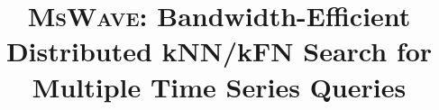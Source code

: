 \documentclass{sig-alternate}
\newcommand{\MSWaveT}{{\LARGE \textsc{MsWave}}}
\begin{document}
%

\title{\MSWaveT{}: Bandwidth-Efficient Distributed kNN/kFN Search for Multiple Time Series Queries}
%
%
%
%
%
\end{document}

